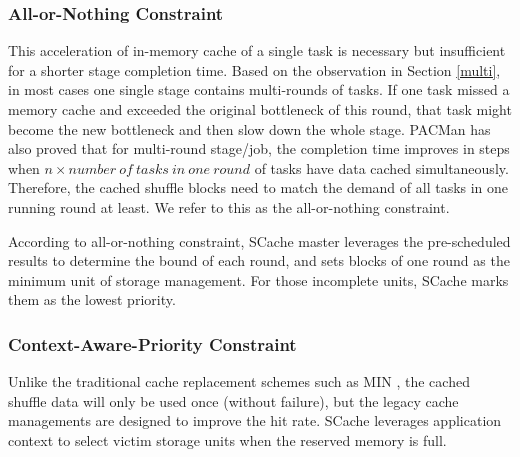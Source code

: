 \subsubsection{All-or-Nothing Constraint}
This acceleration of in-memory cache of a single task is necessary but insufficient for a shorter stage completion time. 
Based on the observation in Section \ref{multi}, in most cases one single stage contains multi-rounds of tasks. 
If one task missed a memory cache and exceeded the original bottleneck of this round, that task might become the new bottleneck and then slow down the whole stage. 
PACMan \cite{pacman} has also proved that for multi-round stage/job, the completion time improves in steps when $n\times number\ of\ tasks\ in\ one\ round$ of tasks have data cached simultaneously. 
Therefore, the cached shuffle blocks need to match the demand of all tasks in one running round at least. We refer to this as the all-or-nothing constraint.

According to all-or-nothing constraint, SCache master leverages the pre-scheduled results to determine the bound of each round, and sets blocks of one round as the minimum unit of storage management.
For those incomplete units, SCache marks them as the lowest priority.

\subsubsection{Context-Aware-Priority Constraint}
Unlike the traditional cache replacement schemes such as MIN \cite{min}, the cached shuffle data will only be used once (without failure), but the legacy cache managements are designed to improve the hit rate.
SCache leverages application context to select victim storage units when the reserved memory is full.

